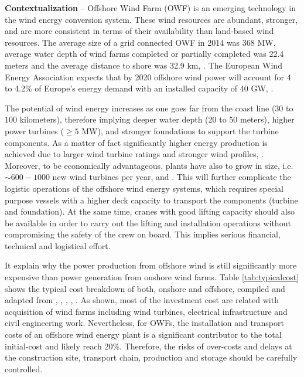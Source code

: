 \textbf{Contextualization} --
Offshore Wind Farm (OWF) is an emerging technology in the wind energy conversion system. These wind resources are abundant, stronger, and are more consistent in terms of their availability than land-based wind resources. The average size of a grid connected OWF in 2014 was 368 MW, average water depth of wind farms completed or partially completed was 22.4 meters and the average distance to shore was 32.9 km, \cite{Giorgio2015}. The European Wind Energy Association expects that by 2020 offshore wind power will account for 4 to 4.2\% of Europe's energy demand with an installed capacity of 40 GW,  \cite{EWEA2011, Kaldellis2013}.

The potential of wind energy increases as one goes far from the coast line (30 to 100 kilometers), therefore implying deeper water depth (20 to 50 meters), higher power turbines ($\geq 5$ MW), and stronger foundations to support the turbine components. As a matter of fact significantly higher energy production is achieved due to larger wind turbine ratings and stronger wind profiles, \cite{Sun2012298}. Moreover, to be economically advantageous, plants have also to grow in size, i.e. $\sim600-1000$ new wind turbines per year, \cite{EWEA2011} and \cite{Kaldellis2013}. This will further complicate the logistic operations of the offshore wind energy systems, which requires special purpose vessels with a higher deck capacity to transport the components (turbine and foundation). At the same time, cranes with good lifting capacity should also be available in order to carry out the lifting and installation operations without compromising the safety of the crew on board. This implies serious financial, technical and logistical effort.

It explain why the power production from offshore wind is still significantly more expensive than power generation from onshore wind farms. Table \ref{tab:typicalcost} shows the typical cost breakdown of both, onshore and offshore, compiled and adapted from \cite{Henderson2003}, \cite{Junginger2004},  \cite{UK10}, \cite{TCE12}, \cite{IRENA12}. As shown, most of the investment cost are related with acquisition of wind farms including wind turbines, electrical infrastructure and civil engineering work. Nevertheless, for OWFs, the installation and transport costs of an offshore wind energy plant is a significant contributor to the total initial-cost and likely reach 20\%. Therefore, the risks of over-costs and delays at the construction site, transport chain, production and storage should be carefully controlled.
